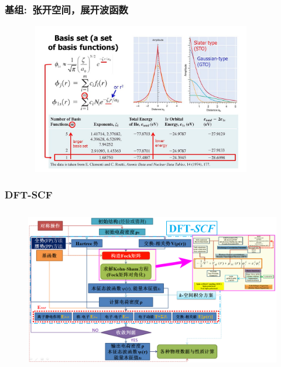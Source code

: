 \frame
{
	\frametitle{基组:~张开空间，展开波函数}
\begin{figure}[h!]
	\vspace{-5pt}
\centering
\includegraphics[height=2.6in,width=4.01in,viewport=0 0 780 550,clip]{Figures/Basis-set-STO-GTO.jpg}
\caption{\fontsize{5.5pt}{4.2pt}}%
\label{Basic-set:STO-GTO}
\end{figure}
}

\frame
{
	\frametitle{\textrm{DFT-SCF}}
\begin{figure}[h!]
\centering
\vspace*{-0.25in}
\hspace*{-0.80in}
\includegraphics[height=2.80in,width=4.95in,viewport=5 3 1490 870,clip]{Figures/DFT-SCF_2.png}
\label{DFT-SCF-2}
\end{figure}
}

